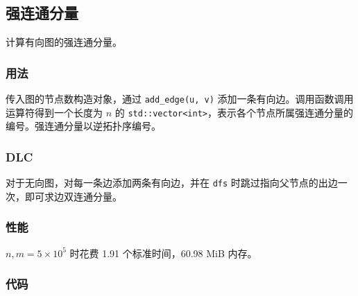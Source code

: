 \subsection{强连通分量}

计算有向图的强连通分量。

\subsubsection{用法}

传入图的节点数构造对象，通过 \lstinline{add_edge(u, v)} 添加一条有向边。调用函数调用运算符得到一个长度为 $n$ 的 \lstinline{std::vector<int>}，表示各个节点所属强连通分量的编号。强连通分量以逆拓扑序编号。

\subsubsection{DLC}

对于无向图，对每一条边添加两条有向边，并在 \lstinline{dfs} 时跳过指向父节点的出边一次，即可求边双连通分量。

\subsubsection{性能}

$n, m = 5 \times 10^5$ 时花费 1.91 个标准时间，60.98 MiB 内存。

\subsubsection{代码}


